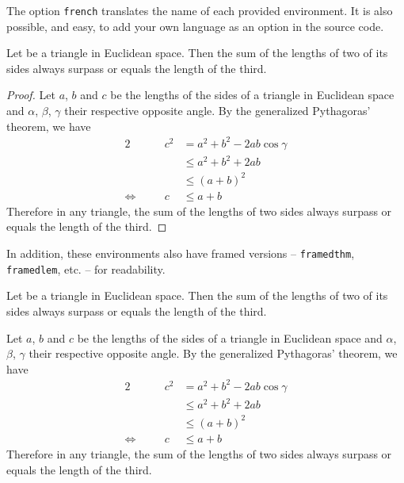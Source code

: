 \documentclass[12pt]{report}
\begin{document}
    \begin{note}
        The option \texttt{french} translates the name of each provided environment. It is also possible, and easy, to add your own language as an option in the source code.
    \end{note}

    \begin{thm}
        Let be a triangle in Euclidean space. Then the sum of the lengths of two of its sides always surpass or equals the length of the third.
    \end{thm}

    \begin{proof}
        Let $a$, $b$ and $c$ be the lengths of the sides of a triangle in Euclidean space and $\alpha$, $\beta$, $\gamma$ their respective opposite angle. By the generalized Pythagoras' theorem, we have
        \begin{alignat*}{2}
                                  &  & c^2 & = a^2 + b^2 - 2ab \cos\gamma \\
                                  &  &     & \leq a^2 + b^2 + 2ab         \\
                                  &  &     & \leq (a + b)^2               \\
            \Leftrightarrow \quad &  & c   & \leq a + b
        \end{alignat*}
        Therefore in any triangle, the sum of the lengths of two sides always surpass or equals the length of the third.
    \end{proof}

    In addition, these environments also have framed versions -- \texttt{framedthm}, \texttt{framedlem}, etc. -- for readability.

    \begin{framedthm}\label{thm:Triangle inequality}
        Let be a triangle in Euclidean space. Then the sum of the lengths of two of its sides always surpass or equals the length of the third.
    \end{framedthm}

    \begin{framedprf}
        Let $a$, $b$ and $c$ be the lengths of the sides of a triangle in Euclidean space and $\alpha$, $\beta$, $\gamma$ their respective opposite angle. By the generalized Pythagoras' theorem, we have
        \begin{alignat*}{2}
                                  &  & c^2 & = a^2 + b^2 - 2ab \cos\gamma \\
                                  &  &     & \leq a^2 + b^2 + 2ab         \\
                                  &  &     & \leq (a + b)^2               \\
            \Leftrightarrow \quad &  & c   & \leq a + b
        \end{alignat*}
        Therefore in any triangle, the sum of the lengths of two sides always surpass or equals the length of the third. \qedadd
    \end{framedprf}
\end{document}
